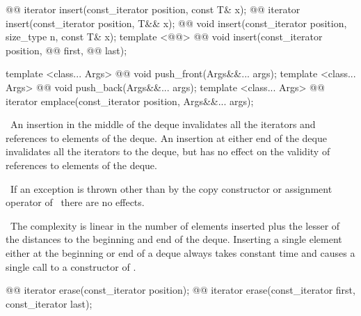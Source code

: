 \documentclass[american,twoside]{book}
\begin{document}
%
%
%
%
\begin{itemdecl}
@@
  iterator insert(const_iterator position, const T& x);
@@
  iterator insert(const_iterator position, T&& x);
@@
  void     insert(const_iterator position, size_type n, const T& x);
template <@@>
  @@
  void insert(const_iterator position,
              @@ first, @@ last);

template <class... Args> 
  @@ 
  void push_front(Args&&... args);
template <class... Args> 
  @@ 
  void push_back(Args&&... args);
template <class... Args> 
  @@ 
  iterator emplace(const_iterator position, Args&&... args);
\end{itemdecl}

\begin{itemdescr}
\pnum
\effects\ 
An insertion in the middle of the deque invalidates all the iterators and
references to elements of the deque.
An insertion at either end of the
deque invalidates all the iterators to the deque, but has no effect on
the validity of references to elements of the deque.

\pnum
\notes\ 
If an exception is thrown other than by the
copy constructor or assignment operator of
\
there are no effects.

\pnum
\complexity\ 
The complexity is linear in the number of elements inserted plus the lesser
of the distances to the beginning and end of the deque.
Inserting a single element either at the beginning or end of a deque always takes constant time
and causes a single call to a constructor of
\tcode{T}.
\end{itemdescr}

\index{erase@\tcode{erase}!\tcode{deque}}%
\begin{itemdecl}
@@ iterator erase(const_iterator position);
@@ iterator erase(const_iterator first, const_iterator last);
\end{itemdecl}
\end{document}
